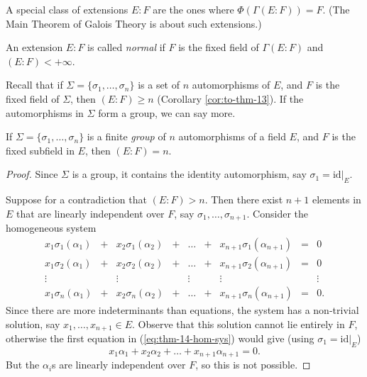 A special class of extensions $E : F$ are the ones where $\Phi(\Gamma(E : F)) = F$. (The Main Theorem of Galois Theory is about such extensions.)

\begin{definition}
	An extension $E : F$ is called \emph{normal} if $F$ is the fixed field of $\Gamma(E : F)$ and $(E : F) < +\infty$.
\end{definition}

Recall that if $\Sigma = \{\sigma_1, \dots, \sigma_n\}$ is a set of $n$ automorphisms of $E$, and $F$ is the fixed field of $\Sigma$, then $(E : F) \geq n$ (Corollary \ref{cor:to-thm-13}). If the automorphisms in $\Sigma$ form a group, we can say more.

\begin{theorem}\label{thm:14}
	If $\Sigma = \{\sigma_1, \dots, \sigma_n\}$ is a finite \emph{group} of $n$ automorphisms of a field $E$, and $F$ is the fixed subfield in $E$, then $(E : F) = n$.
	\begin{proof}
		Since $\Sigma$ is a group, it contains the identity automorphism, say $\sigma_1 = \text{id}|_E$.
		
		Suppose for a contradiction that $(E : F) > n$. Then there exist $n + 1$ elements in $E$ that are linearly independent over $F$, say $\sigma_1, \dots, \sigma_{n + 1}$. Consider the homogeneous system
		\begin{equation}\label{eq:thm-14-hom-sys}
			\begin{matrix}
				x_1 \sigma_1(\alpha_1) & + & x_2 \sigma_1(\alpha_2) & + & \dots & + & x_{n + 1} \sigma_1(\alpha_{n + 1}) & = & 0 \\
				x_1 \sigma_2(\alpha_1) & + & x_2 \sigma_2(\alpha_2) & + & \dots & + & x_{n + 1} \sigma_2(\alpha_{n + 1}) & = & 0 \\
				\vdots &  & \vdots &  & \vdots &  & \vdots &  & \vdots \\
				x_1 \sigma_n(\alpha_1) & + & x_2 \sigma_n(\alpha_2) & + & \dots & + & x_{n + 1} \sigma_n(\alpha_{n + 1}) & = & 0.
			\end{matrix}
		\end{equation}
		Since there are more indeterminants than equations, the system has a non-trivial solution, say $x_1, \dots, x_{n + 1} \in E$. Observe that this solution cannot lie entirely in $F$, otherwise the first equation in (\ref{eq:thm-14-hom-sys}) would give (using $\sigma_1 = \text{id}|_E$)
		\[
			x_1 \alpha_1 + x_2 \alpha_2 + \dots + x_{n + 1} \alpha_{n + 1} = 0.
		\]
		But the $\alpha_i$s are linearly independent over $F$, so this is not possible.
		

\end{proof}
\end{theorem}
